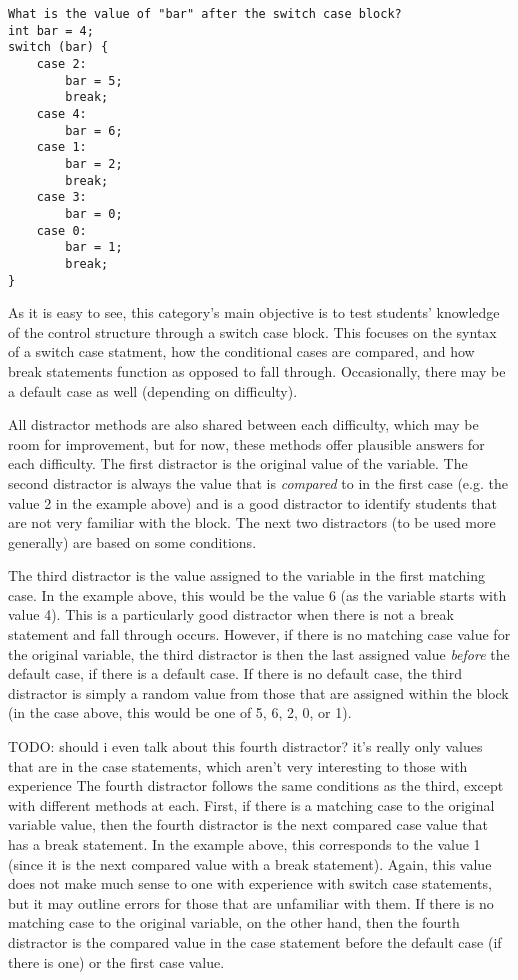 \documentclass{article}
\begin{document}
\begin{lstlisting}
What is the value of "bar" after the switch case block?
int bar = 4; 
switch (bar) { 
	case 2: 
		bar = 5; 
		break; 
	case 4: 
		bar = 6; 
	case 1: 
		bar = 2;
		break; 
	case 3: 
		bar = 0; 
	case 0: 
		bar = 1; 
		break; 
} 
\end{lstlisting}

As it is easy to see, this category's main objective is to test students' knowledge of the control structure through a switch case block. This focuses on the syntax of a switch case statment, how
the conditional cases are compared, and how break statements function as opposed to fall through. Occasionally, there may be a default case as well (depending on difficulty). 

All distractor methods are also shared between each difficulty, which may be room for improvement, but for now, these methods offer plausible answers for each difficulty. The first distractor is
the original value of the variable. The second distractor is always the value that is \textit{compared} to in the first case (e.g. the value 2 in the example above) and is a good distractor to identify students that are not very familiar with the block. The next two distractors (to be used more generally) are based on some conditions. 

The third distractor is the value assigned to the variable in the first matching case. In the example above, this would be the value 6 (as the variable starts with value 4). This is a particularly good distractor when there is not a break statement
and fall through occurs. However, if there is no matching case value for the original variable, the third distractor is then the last assigned value \textit{before} the default case, if there is a
default case. If there is no default case, the third distractor is simply a random value from those that are assigned within the block (in the case above, this would be one of 5, 6, 2, 0, or 1). 

TODO: should i even talk about this fourth distractor? it's really only values that are in the case statements, which aren't very interesting to those with experience
The fourth distractor follows the same conditions as the third, except with different methods at each. First, if there is a matching case to the original variable value, then the fourth distractor
is the next compared case value that has a break statement. In the example above, this corresponds to the value 1 (since it is the next compared value with a break statement). Again, this
value does not make much sense to one with experience with switch case statements, but it may outline errors for those that are unfamiliar with them. If there is no matching case to the 
original variable, on the other hand, then the fourth distractor is the compared value in the case statement before the default case (if there is one) or the first case value. 
\end{document}
